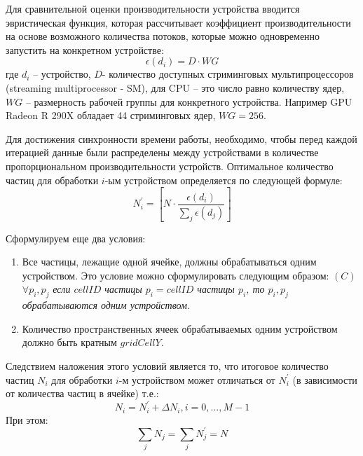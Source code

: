 Для сравнительной оценки производительности устройства вводится эвристическая функция, которая рассчитывает коэффициент производительности на основе возможного количества потоков, которые можно одновременно запустить на конкретном устройстве:
\[
\epsilon(d_i)=D \cdot WG
\]
где \(d_i\) – устройство, \(D\)- количество доступных стриминговых мультипроцессоров (streaming multiprocessor - SM), для CPU – это число равно количеству ядер, \(WG\) – размерность рабочей группы для конкретного устройства. Например GPU Radeon R 290X обладает 44 стриминговых ядер, \(WG=256\).

Для достижения синхронности времени работы, необходимо, чтобы перед каждой итерацией данные были распределены между устройствами в количестве пропорциональном производительности устройств. Оптимальное количество частиц для обработки \(i\)-ым устройством определяется по следующей формуле:
\[
N_{i}^{'}=\left [ N \cdot \frac{\epsilon(d_i)}{\sum_{j}\epsilon(d_j)} \right ]
\]

Сформулируем еще два условия:
\noindent
\begin{enumerate}
  \item Все частицы, лежащие одной ячейке, должны обрабатываться одним устройством. Это условие можно сформулировать следующим образом:
\((C)\) \(\forall p_i, p_j\) \textit{если \(cellID\) частицы \(p_i=cellID\) частицы \(p_i\), то \(p_i, p_j\) обрабатываются одним устройством.}
  \item Количество пространственных ячеек обрабатываемых одним устройством должно быть кратным \(gridCellY\). 
\end{enumerate}

Следствием наложения этого условий является то, что итоговое количество частиц \(N_i \) для обработки \(i\)-м устройством  может отличаться от \(N_{i}^{'}\) (в зависимости от количества частиц в ячейке) т.е.:
\[
N_i = N_{i}^{'}+\Delta N_i, i=0,..., M-1 
\]
При этом:
\[
\sum_{j} N_j = \sum_{j}N_{j}^{'}=N
\]

